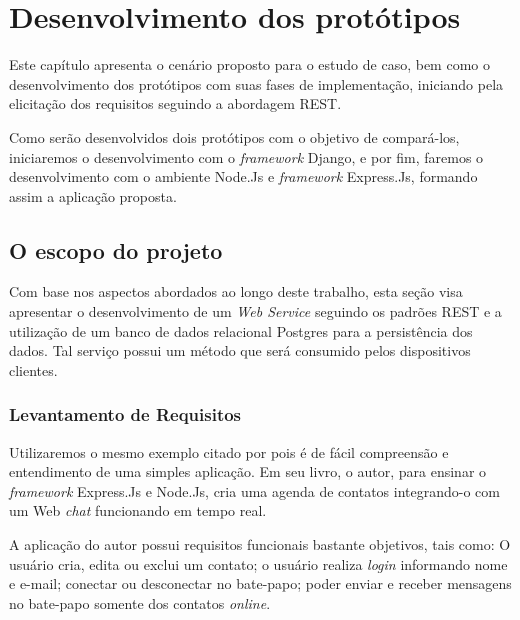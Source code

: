 
\chapter{Desenvolvimento dos protótipos}
\label{desenvolvimento-prototipos}

\vspace{-1.9cm}


  Este capítulo apresenta o cenário proposto para o estudo de caso, bem
  como o desenvolvimento dos protótipos com suas fases de implementação, iniciando
  pela elicitação dos requisitos seguindo a abordagem \ac{REST}.
  
  Como serão desenvolvidos dois protótipos com o objetivo de compará-los, iniciaremos o desenvolvimento com o \textit{framework} Django, e por fim, faremos o desenvolvimento
  com o ambiente Node.Js e \textit{framework} Express.Js, formando assim a aplicação proposta.
  
\section{O escopo do projeto}
\label{escopo-projeto}

  Com base nos aspectos abordados ao longo deste trabalho, 
  esta seção visa apresentar o desenvolvimento de um \textit{Web Service} seguindo os padrões \ac{REST} e a utilização 
  de um banco de dados relacional Postgres para a persistência dos dados.  
  Tal serviço possui um método que será consumido pelos dispositivos clientes.

\subsection{Levantamento de Requisitos}
\label{levantamento-requisitos}

  Utilizaremos o mesmo exemplo citado por  pois é de fácil compreensão
  e entendimento de uma simples aplicação. Em seu livro, o autor, para ensinar o \textit{framework}
  Express.Js e Node.Js, cria uma agenda de contatos integrando-o com um Web \textit{chat} funcionando em tempo real.
  
  A aplicação do autor possui requisitos funcionais bastante objetivos, tais como: O usuário cria, edita ou exclui um contato; 
  o usuário realiza \textit{login} informando nome e e-mail; conectar ou desconectar no bate-papo; poder enviar e receber mensagens 
  no bate-papo somente dos contatos \textit{online}.
  
